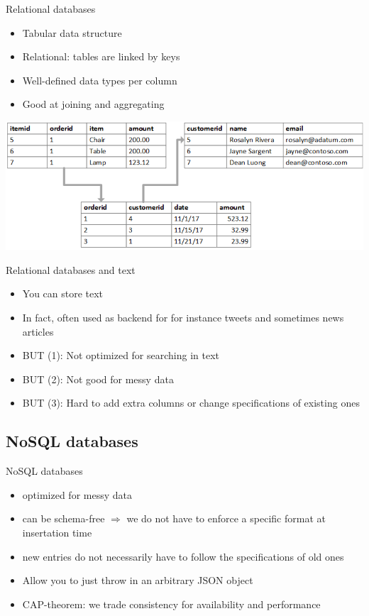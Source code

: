 \documentclass{beamer}
\begin{document}
\begin{frame}[<+->]{Relational databases}
	\begin{itemize}
		\item Tabular data structure
		\item Relational: tables are linked by keys
		\item Well-defined data types per column
		\item Good at joining and aggregating
	\end{itemize}
\end{frame}


\begin{frame}
\includegraphics[width=\columnwidth,height=\paperheight,keepaspectratio]{example-relational2}
\end{frame}


\begin{frame}[<+->]{Relational databases and text}
	\begin{itemize}
		\item You can store text
		\item In fact, often used as backend for for instance tweets and sometimes news articles
		\item BUT (1): Not optimized for searching in text
		\item BUT (2): Not good for messy data
		\item BUT (3): Hard to add extra columns or change specifications of existing ones
	\end{itemize}
\end{frame}



\subsection{NoSQL databases}

\begin{frame}[<+->]{NoSQL databases}
	\begin{itemize}
		\item optimized for messy data
		\item can be schema-free $\Rightarrow$ we do not have to enforce a specific format at insertation time 
		\item new entries do not necessarily have to follow the specifications of old ones
		\item Allow you to just throw in an arbitrary JSON object
		\item CAP-theorem: we trade consistency for availability and performance
	\end{itemize}
\end{frame}
\end{document}
